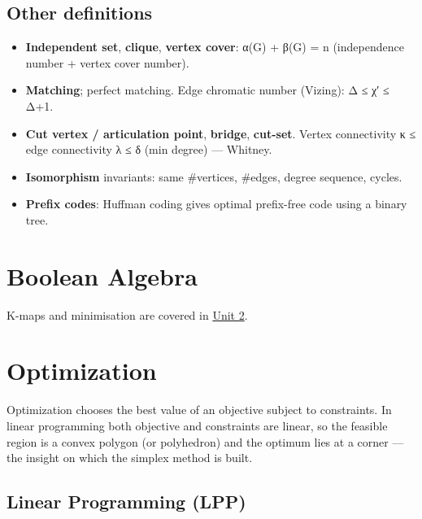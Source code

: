 \needspace{95pt}

\hypertarget{p2-01--55-other-definitions}{%
\subsection{Other definitions}\label{p2-01--55-other-definitions}}

\begin{itemize}
\tightlist
\item
  \textbf{Independent set}, \textbf{clique}, \textbf{vertex cover}: α(G) + β(G) = n (independence number + vertex cover number).
\item
  \textbf{Matching}; perfect matching. Edge chromatic number (Vizing): Δ ≤ χ′ ≤ Δ+1.
\item
  \textbf{Cut vertex / articulation point}, \textbf{bridge}, \textbf{cut-set}. Vertex connectivity κ ≤ edge connectivity λ ≤ δ (min degree) --- Whitney.
\item
  \textbf{Isomorphism} invariants: same \#vertices, \#edges, degree sequence, cycles.
\item
  \textbf{Prefix codes}: Huffman coding gives optimal prefix-free code using a binary tree.
\end{itemize}

\needspace{95pt}

\hypertarget{p2-01--6-boolean-algebra}{%
\section{Boolean Algebra}\label{p2-01--6-boolean-algebra}}



K-maps and minimisation are covered in \protect\hyperlink{p2-02}{Unit 2}.

\needspace{161pt}

\hypertarget{p2-01--7-optimization}{%
\section{Optimization}\label{p2-01--7-optimization}}

Optimization chooses the best value of an objective subject to constraints. In linear programming both
objective and constraints are linear, so the feasible region is a convex polygon (or polyhedron) and the
optimum lies at a corner --- the insight on which the simplex method is built.

\needspace{95pt}

\hypertarget{p2-01--71-linear-programming-lpp}{%
\subsection{Linear Programming (LPP)}\label{p2-01--71-linear-programming-lpp}}

